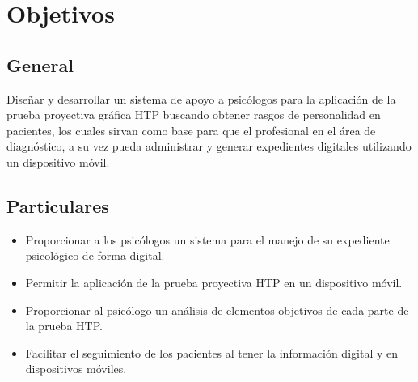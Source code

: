 \section{Objetivos}

\subsection{General}

Diseñar y desarrollar un sistema de apoyo a psicólogos para la aplicación de la prueba proyectiva gráfica HTP buscando obtener rasgos de personalidad en pacientes, los cuales sirvan como base para que el profesional en el área de diagnóstico, a su vez pueda administrar y generar expedientes digitales utilizando un dispositivo móvil.
\\

\subsection{Particulares}

\begin{itemize}
\item Proporcionar a los psicólogos un sistema para el manejo de su expediente psicológico de forma digital.
\item Permitir la aplicación de la prueba proyectiva HTP en un dispositivo móvil.
\item Proporcionar al psicólogo un análisis de elementos objetivos de cada parte de la prueba HTP.
\item Facilitar el seguimiento de los pacientes al tener la información digital y en dispositivos móviles.
\end{itemize}